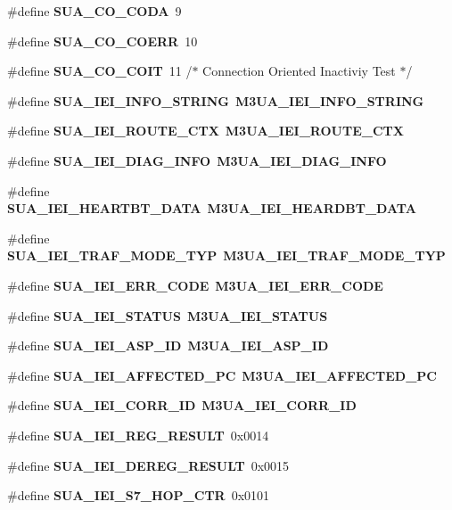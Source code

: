 \begin{DoxyCompactItemize}
\item 
\#define {\bf S\+U\+A\+\_\+\+C\+O\+\_\+\+C\+O\+DA}~9
\item 
\#define {\bf S\+U\+A\+\_\+\+C\+O\+\_\+\+C\+O\+E\+RR}~10
\item 
\#define {\bf S\+U\+A\+\_\+\+C\+O\+\_\+\+C\+O\+IT}~11 /$\ast$ Connection Oriented Inactiviy Test $\ast$/
\item 
\#define {\bf S\+U\+A\+\_\+\+I\+E\+I\+\_\+\+I\+N\+F\+O\+\_\+\+S\+T\+R\+I\+NG}~{\bf M3\+U\+A\+\_\+\+I\+E\+I\+\_\+\+I\+N\+F\+O\+\_\+\+S\+T\+R\+I\+NG}
\item 
\#define {\bf S\+U\+A\+\_\+\+I\+E\+I\+\_\+\+R\+O\+U\+T\+E\+\_\+\+C\+TX}~{\bf M3\+U\+A\+\_\+\+I\+E\+I\+\_\+\+R\+O\+U\+T\+E\+\_\+\+C\+TX}
\item 
\#define {\bf S\+U\+A\+\_\+\+I\+E\+I\+\_\+\+D\+I\+A\+G\+\_\+\+I\+N\+FO}~{\bf M3\+U\+A\+\_\+\+I\+E\+I\+\_\+\+D\+I\+A\+G\+\_\+\+I\+N\+FO}
\item 
\#define {\bf S\+U\+A\+\_\+\+I\+E\+I\+\_\+\+H\+E\+A\+R\+T\+B\+T\+\_\+\+D\+A\+TA}~{\bf M3\+U\+A\+\_\+\+I\+E\+I\+\_\+\+H\+E\+A\+R\+D\+B\+T\+\_\+\+D\+A\+TA}
\item 
\#define {\bf S\+U\+A\+\_\+\+I\+E\+I\+\_\+\+T\+R\+A\+F\+\_\+\+M\+O\+D\+E\+\_\+\+T\+YP}~{\bf M3\+U\+A\+\_\+\+I\+E\+I\+\_\+\+T\+R\+A\+F\+\_\+\+M\+O\+D\+E\+\_\+\+T\+YP}
\item 
\#define {\bf S\+U\+A\+\_\+\+I\+E\+I\+\_\+\+E\+R\+R\+\_\+\+C\+O\+DE}~{\bf M3\+U\+A\+\_\+\+I\+E\+I\+\_\+\+E\+R\+R\+\_\+\+C\+O\+DE}
\item 
\#define {\bf S\+U\+A\+\_\+\+I\+E\+I\+\_\+\+S\+T\+A\+T\+US}~{\bf M3\+U\+A\+\_\+\+I\+E\+I\+\_\+\+S\+T\+A\+T\+US}
\item 
\#define {\bf S\+U\+A\+\_\+\+I\+E\+I\+\_\+\+A\+S\+P\+\_\+\+ID}~{\bf M3\+U\+A\+\_\+\+I\+E\+I\+\_\+\+A\+S\+P\+\_\+\+ID}
\item 
\#define {\bf S\+U\+A\+\_\+\+I\+E\+I\+\_\+\+A\+F\+F\+E\+C\+T\+E\+D\+\_\+\+PC}~{\bf M3\+U\+A\+\_\+\+I\+E\+I\+\_\+\+A\+F\+F\+E\+C\+T\+E\+D\+\_\+\+PC}
\item 
\#define {\bf S\+U\+A\+\_\+\+I\+E\+I\+\_\+\+C\+O\+R\+R\+\_\+\+ID}~{\bf M3\+U\+A\+\_\+\+I\+E\+I\+\_\+\+C\+O\+R\+R\+\_\+\+ID}
\item 
\#define {\bf S\+U\+A\+\_\+\+I\+E\+I\+\_\+\+R\+E\+G\+\_\+\+R\+E\+S\+U\+LT}~0x0014
\item 
\#define {\bf S\+U\+A\+\_\+\+I\+E\+I\+\_\+\+D\+E\+R\+E\+G\+\_\+\+R\+E\+S\+U\+LT}~0x0015
\item 
\#define {\bf S\+U\+A\+\_\+\+I\+E\+I\+\_\+\+S7\+\_\+\+H\+O\+P\+\_\+\+C\+TR}~0x0101
\item 

\end{DoxyCompactItemize}
